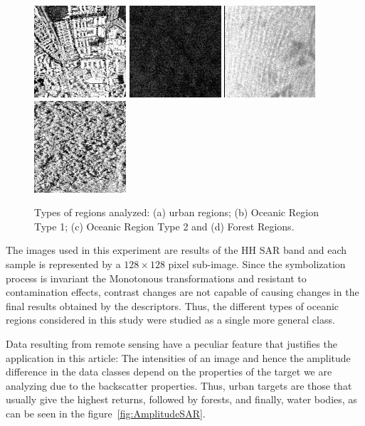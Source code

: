 \documentclass{isprs}
\begin{document}
	\begin{figure}[hbt]
		\centering
		\includegraphics[width=.23\linewidth]{Figures/munichUrban.png}
		\includegraphics[width=.23\linewidth]{Figures/Cape1.png}
		\includegraphics[width=.23\linewidth]{Figures/Cape2.png}
		\includegraphics[width=.23\linewidth]{Figures/guatemalaflorest.png}
		\caption{Types of regions analyzed: (a) urban regions; (b) Oceanic Region Type 1; (c) Oceanic Region Type 2 and (d) Forest Regions.}\label{fig:RegioesSAR}
	\end{figure} 
	
	The images used in this experiment are results of the HH SAR band and each sample is represented by a $128 \times 128$ pixel sub-image.
	Since the symbolization process is invariant the Monotonous transformations and resistant to contamination effects, contrast changes are not capable of causing changes in the final results obtained by the descriptors.
	Thus, the different types of oceanic regions considered in this study were studied as a single more general class.
	
	Data resulting from remote sensing have a peculiar feature that justifies the application in this article:
	The intensities of an image and hence the amplitude difference in the data classes depend on the properties of the target we are analyzing due to the backscatter properties.
	Thus, urban targets are those that usually give the highest returns, followed by forests, and finally, water bodies, as can be seen in the figure~\ref{fig:AmplitudeSAR}.
	
\end{document}
